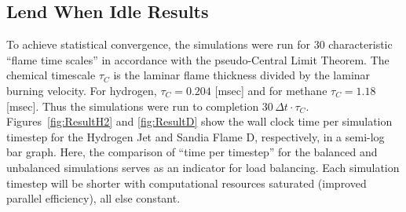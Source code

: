 \documentclass[letterpaper,twocolumn,10pt]{article}
\begin{document}
\subsection{Lend When Idle Results}
To achieve statistical convergence, the simulations were run for 30 characteristic ``flame time scales'' in accordance with the pseudo-Central Limit Theorem. The chemical timescale $\tau_C$ is the laminar flame thickness divided by the laminar burning velocity. For hydrogen, $\tau_C = 0.204$ [msec] and for methane $\tau_C = 1.18$ [msec]. Thus the simulations were run to completion $30 \, \Delta t \cdot \tau_C$. Figures~\ref{fig:ResultH2} and \ref{fig:ResultD} show the wall clock time per simulation timestep for the Hydrogen Jet and Sandia Flame D, respectively, in a semi-log bar graph. Here, the comparison of ``time per timestep'' for the balanced and unbalanced simulations serves as an indicator for load balancing. Each simulation timestep will be shorter with computational resources saturated (improved parallel efficiency), all else constant.
\end{document}
